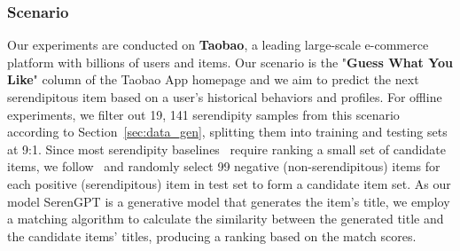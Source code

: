 
\subsubsection{Scenario} Our experiments are conducted on \textbf{Taobao}, a leading large-scale e-commerce platform with billions of users and items. Our scenario is the "\textbf{Guess What You Like}" column of the Taobao App homepage and we aim to predict the next serendipitous item based on a user's historical behaviors and profiles. For offline experiments, we filter out 19, 141 serendipity samples from this scenario according to Section~\ref{sec:data_gen}, splitting them into training and testing sets at 9:1. Since most serendipity baselines~\cite{fu2024art,tokutake2024can} require ranking a small set of candidate items, we follow~\cite{fu2024art} and randomly select 99 negative (non-serendipitous) items for each positive (serendipitous) item in test set to form a candidate item set. As our model SerenGPT is a generative model that generates the item's title, we employ a matching algorithm to calculate the similarity between the generated title and the candidate items' titles, producing a ranking based on the match scores. 


